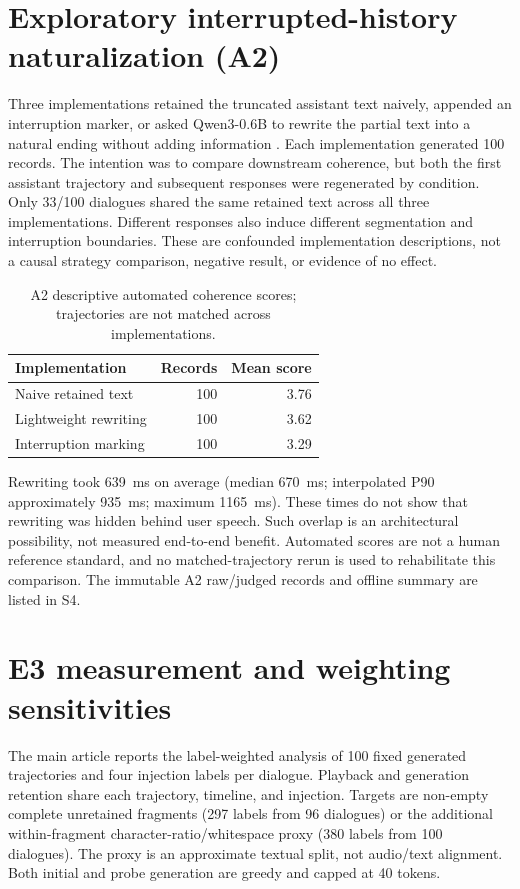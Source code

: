 \documentclass[12pt]{article}
\begin{document}
\section{Exploratory interrupted-history naturalization (A2)}
\label{sec:s-a2}

Three implementations retained the truncated assistant text naively, appended an interruption marker, or asked Qwen3-0.6B to rewrite the partial text into a natural ending without adding information \citep{yang2025Qwen3}. Each implementation generated 100 records. The intention was to compare downstream coherence, but both the first assistant trajectory and subsequent responses were regenerated by condition. Only 33/100 dialogues shared the same retained text across all three implementations. Different responses also induce different segmentation and interruption boundaries. These are confounded implementation descriptions, not a causal strategy comparison, negative result, or evidence of no effect.

\begin{table}[t]
\centering\small
\caption{A2 descriptive automated coherence scores; trajectories are not matched across implementations.}
\begin{tabularx}{\linewidth}{@{}Yrr@{}}
\toprule
Implementation & Records & Mean score \\
\midrule
Naive retained text & 100 & 3.76 \\
Lightweight rewriting & 100 & 3.62 \\
Interruption marking & 100 & 3.29 \\
\bottomrule
\end{tabularx}
\end{table}

Rewriting took 639~ms on average (median 670~ms; interpolated P90 approximately 935~ms; maximum 1165~ms). These times do not show that rewriting was hidden behind user speech. Such overlap is an architectural possibility, not measured end-to-end benefit. Automated scores are not a human reference standard, and no matched-trajectory rerun is used to rehabilitate this comparison. The immutable A2 raw/judged records and offline summary are listed in S4.

\section{E3 measurement and weighting sensitivities}
\label{sec:s-e3}

The main article reports the label-weighted analysis of 100 fixed generated trajectories and four injection labels per dialogue. Playback and generation retention share each trajectory, timeline, and injection. Targets are non-empty complete unretained fragments (297 labels from 96 dialogues) or the additional within-fragment character-ratio/whitespace proxy (380 labels from 100 dialogues). The proxy is an approximate textual split, not audio/text alignment. Both initial and probe generation are greedy and capped at 40 tokens.
\end{document}
